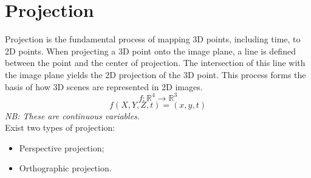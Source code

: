 \section{Projection}
Projection is the fundamental process of mapping 3D points, including time, to 2D points. When projecting a 3D point onto the image plane, a line is defined between the point and the center of projection. The intersection of this line with the image plane yields the 2D projection of the 3D point. This process forms the basis of how 3D scenes are represented in 2D images.
\[
    f: \mathbb{R}^4 \rightarrow \mathbb{R}^3    
\]
\[
    f(X,Y,Z,t) = (x,y,t)
\]
\textit{NB: These are continuous variables.}       
\\
Exist two types of projection:
\begin{itemize}
    \item Perspective projection;
    \item Orthographic projection.
\end{itemize}
